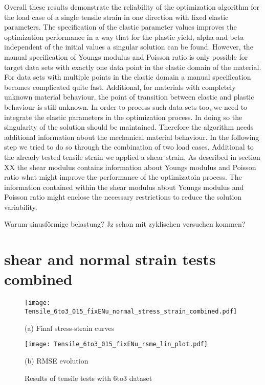     Overall these results demonstrate the reliability of the optimization algorithm for the load case of a single tensile strain in one direction with fixed elastic parameters. The specification of the elastic parameter values improves the optimization performance in a way that for the plastic yield, alpha and beta independent of the initial values a singular solution can be found. However, the manual specification of Youngs modulus and Poisson ratio is only possible for target data sets with exactly one data point in the elastic domain of the material. For data sets with multiple points in the elastic domain a manual specification becomes complicated quite fast. Additional, for materials with completely unknown material behaviour, the point of transition between elastic and plastic behaviour is still unknown. In order to process such data sets too, we need to integrate the elastic parameters in the optimization process. In doing so the singularity of the solution should be maintained. Therefore the algorithm needs additional information about the mechanical material behaviour. In the following step we tried to do so through the combination of two load cases. Additional to the already tested tensile strain we applied a shear strain. As described in section XX the shear modulus contains information about Youngs modulus and  Poisson ratio what might improve the performance of the optimizatoin process. The information contained within the shear modulus about Youngs modulus and Poisson ratio might enclose the necessary restrictions to reduce the solution variability. 
    
    Warum sinusförmige belastung? Jz schon mit zyklischen versuchen kommen?
    

    \section{shear and normal strain tests combined}

    \begin{figure}[H]
        \centering
        \begin{minipage}[t]{0.495\textwidth}
            \centering
            \texttt{[image: Tensile\_6to3\_015\_fixENu\_normal\_stress\_strain\_combined.pdf]}
            \caption*{(a) Final stress-strain curves}
            \label{fig:tensileStressStrain6to3}
        \end{minipage}
        \hfill
        \begin{minipage}[t]{0.495\textwidth}
            \centering
            \texttt{[image: Tensile\_6to3\_015\_fixENu\_rsme\_lin\_plot.pdf]}
            \caption*{(b) RMSE evolution}
            \label{subfigure:tensileRMSE}
        \end{minipage}
        \caption{Results of tensile tests with 6to3 dataset}
        \label{fig:tensileResults6to3}
    \end{figure}

